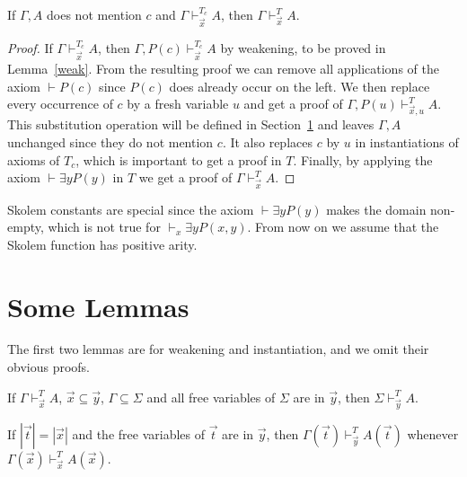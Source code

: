 \documentclass{fundam}
\begin{document}
\begin{theorem}
If $\Gamma,A$ does not mention $c$ and $\Gamma\vdash_{\vec{x}}^{T_c} A$, then
$\Gamma\vdash_{\vec{x}}^{T} A$.
\end{theorem}

\begin{proof} 
If $\Gamma\vdash_{\vec{x}}^{T_c} A$, then $\Gamma,P(c)\vdash_{\vec{x}}^{T_c} A$
by weakening, to be proved in Lemma~\ref{weak}.
From the resulting proof we can remove all applications of
the axiom $\vdash P(c)$ since $P(c)$ does already occur on the left. We then
replace every occurrence of $c$ by a fresh variable $u$ and 
get a proof of $\Gamma,P(u)\vdash_{\vec{x},u}^{T} A$.
This substitution operation will be defined in Section~\ref{auxlemmas}
and leaves $\Gamma,A$ unchanged since they do not mention $c$.
It also replaces $c$ by $u$ in instantiations of axioms of $T_c$,
which is important to get a proof in $T$. Finally,
by applying the axiom $\vdash\exists y P(y)$ in $T$ 
we get a proof of $\Gamma\vdash_{\vec{x}}^{T} A$.
\end{proof}

Skolem constants are special since the axiom $\vdash\exists y P(y)$
makes the domain non-empty, which is not true for $\vdash_x\exists y P(x,y)$.
From now on we assume that the Skolem function has positive arity.

\section{Some Lemmas}\label{auxlemmas}

The first two lemmas are for weakening and instantiation, and we omit their obvious proofs.

\begin{lemma}\label{weak}
If $\Gamma\vdash_{\vec{x}}^T A$, $\vec{x}\subseteq \vec{y}$, $\Gamma\subseteq \Sigma$ and all free variables of $\Sigma$ are in $\vec{y}$, then $\Sigma\vdash_{\vec{y}}^T A$.
\end{lemma}

\begin{lemma}\label{subst1}
If $|\vec{t}| =|\vec{x}|$ and the free variables of $\vec{t}$ are in $\vec{y}$, 
then $\Gamma(\vec{t})\vdash_{\vec{y}}^T A(\vec{t})$ whenever
$\Gamma(\vec{x})\vdash_{\vec{x}}^T A(\vec{x})$.
\end{lemma}
\end{document}
